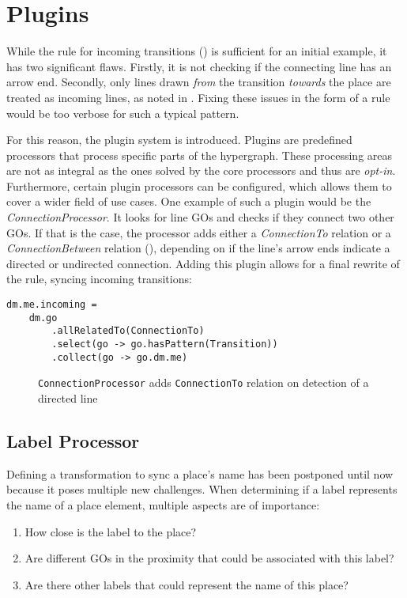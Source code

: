 \section{Plugins}
\label{sec:plugins}
While the rule for incoming transitions () is sufficient for an initial example, it has two significant flaws. Firstly, it is not checking if the connecting line has an arrow end. Secondly, only lines drawn \emph{from} the transition \emph{towards} the place are treated as incoming lines, as noted in . Fixing these issues in the form of a rule would be too verbose for such a typical pattern.

For this reason, the plugin system is introduced. Plugins are predefined processors that process specific parts of the hypergraph. These processing areas are not as integral as the ones solved by the core processors and thus are \emph{opt-in}. Furthermore, certain plugin processors can be configured, which allows them to cover a wider field of use cases. One example of such a plugin would be the \emph{ConnectionProcessor}. It looks for line GOs and checks if they connect two other GOs. If that is the case, the processor adds either a \emph{ConnectionTo} relation or a \emph{ConnectionBetween} relation (), depending on if the line's arrow ends indicate a directed or undirected connection. Adding this plugin allows for a final rewrite of the rule, syncing incoming transitions:

\begin{lstlisting}[captionpos=b,caption={Final iteration of the place incoming transition rule}]
dm.me.incoming = 
    dm.go
        .allRelatedTo(ConnectionTo)
        .select(go -> go.hasPattern(Transition))
        .collect(go -> go.dm.me)
\end{lstlisting}

\begin{figure}[ht]
  \centering
  
  \caption{\texttt{ConnectionProcessor} adds \texttt{ConnectionTo} relation on detection of a directed line}
  \label{fig:transition-plugin}
\end{figure}

\subsection{Label Processor}
Defining a transformation to sync a place's name has been postponed until now because it poses multiple new challenges. When determining if a label represents the name of a place element, multiple aspects are of importance:
\begin{enumerate}
  \item How close is the label to the place?
  \item Are different GOs in the proximity that could be associated with this label?
  \item Are there other labels that could represent the name of this place?
\end{enumerate}

